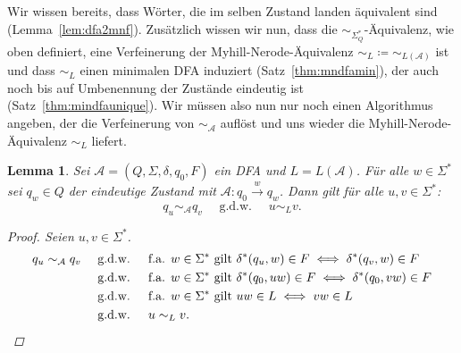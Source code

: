 \documentclass[11pt, a4paper]{article}
\theoremstyle{definition}
\theoremstyle{plain}
\newtheorem{lemma}[definition]{Lemma}
\numberwithin{equation}{section}
\newcommand{\reaches}[1]{\overset{#1}{\rightarrow}}
\begin{document}
Wir wissen bereits, dass Wörter, die im selben Zustand landen äquivalent sind (Lemma~\ref{lem:dfa2mnf}). Zusätzlich wissen wir nun, dass die $\sim_{\Sigma^\ast_Q}$-Äquivalenz, wie oben definiert, eine Verfeinerung der Myhill-Nerode-Äquivalenz $\sim_L \coloneqq \sim_{L(\mathcal{A})}$ ist und dass $\sim_L$ einen minimalen DFA induziert (Satz~\ref{thm:mndfamin}), der auch noch bis auf Umbenennung der Zustände eindeutig ist (Satz~\ref{thm:mindfaunique}). Wir müssen also nun nur noch einen Algorithmus angeben, der die Verfeinerung von $\sim_\mathcal{A}$ auflöst und uns wieder die Myhill-Nerode-Äquivalenz $\sim_L$ liefert.
\begin{lemma}\label{lem:mn_se}
	Sei $\mathcal{A} = (Q, \Sigma, \delta, q_0, F)$ ein DFA und $L = L(\mathcal{A})$. Für alle $w \in \Sigma^\ast$ sei $q_w \in Q$ der eindeutige Zustand mit $\mathcal{A}: q_0 \reaches{w} q_w$. Dann gilt für alle $u, v \in \Sigma^\ast$:
	$$
		q_u \sim_\mathcal{A} q_v \quad\text{ g.d.w. }\quad u \sim_L v.
	$$
	\begin{proof}
		Seien $u, v \in \Sigma^\ast$.
		\begin{align*}
			q_u \sim_\mathcal{A} q_v &\quad\text{ g.d.w. }\quad \text{f.a. } w \in \Sigma^\ast \text{ gilt } \delta^\ast(q_u, w) \in F \iff \delta^\ast(q_v, w) \in F\\
			&\quad\text{ g.d.w. }\quad \text{f.a. } w \in \Sigma^\ast \text{ gilt } \delta^\ast(q_0, uw) \in F \iff \delta^\ast(q_0, vw) \in F\\
			&\quad\text{ g.d.w. }\quad \text{f.a. } w \in \Sigma^\ast \text{ gilt } uw \in L \iff vw \in L\\
			&\quad\text{ g.d.w. }\quad u \sim_L v.\qedhere
		\end{align*}
	\end{proof}
\end{lemma}
\end{document}
